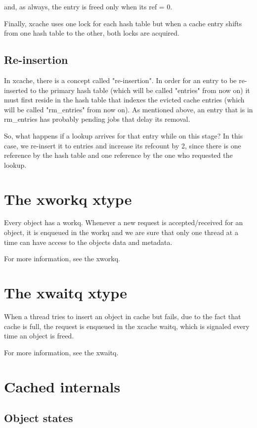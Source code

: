 and, as always, the entry is freed only when its ref = 0.

Finally, xcache uses one lock for each hash table but when a cache entry shifts
from one hash table to the other, both locks are acquired.

\subsection{Re-insertion}

In xcache, there is a concept called "re-insertion". In order for an entry to
be re-inserted to the primary hash table (which will be called "entries" from
now on) it must first reside in the hash table that indexes the evicted cache
entries (which will be called "rm\_entries" from now on). As mentioned above,
an entry that is in rm\_entries has probably pending jobs that delay its
removal.

So, what happens if a lookup arrives for that entry while on this stage? In
this case, we re-insert it to entries and increase its refcount by 2, since
there is one reference by the hash table and one reference by the one who
requested the lookup.


\section{The xworkq xtype}

Every object has a workq. Whenever a new request is accepted/received for an
object, it is enqueued in the workq and we are sure that only one thread at a
time can have access to the objects data and metadata.

For more information, see the xworkq.

\section{The xwaitq xtype}

When a thread tries to insert an object in cache but fails, due to the fact
that cache is full, the request is enqueued in the xcache waitq, which is
signaled every time an object is freed.

For more information, see the xwaitq.

\section{Cached internals}

\subsection{Object states}

